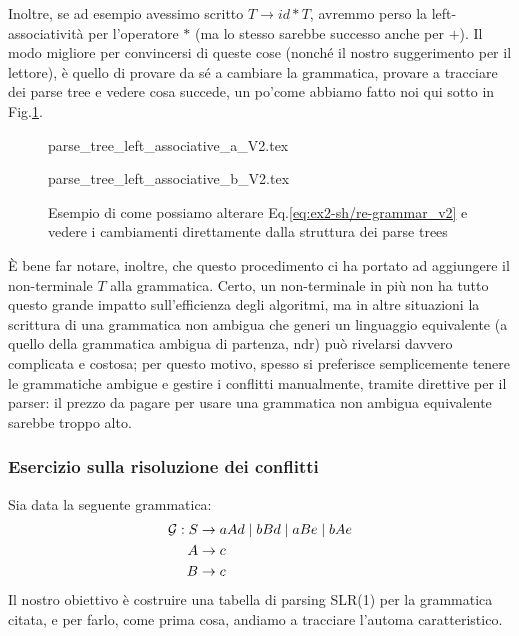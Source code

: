 \documentclass[class=book, crop=false, oneside, 12pt]{standalone}
\begin{document}
Inoltre, se ad esempio avessimo scritto \(T \to id * T\), avremmo perso la left-associatività per l'operatore \(\ast\) (ma lo stesso sarebbe successo anche per \(+\)). Il modo migliore per convincersi di queste cose (nonché il nostro suggerimento per il lettore), è quello di provare da sé a cambiare la grammatica, provare a tracciare dei parse tree e vedere cosa succede, un po'come abbiamo fatto noi qui sotto in Fig.\ref{fig:ex2-sh_re-altgrm-ptree}.
\begin{figure}[H]
    \begin{minipage}[b]{.4\textwidth}
        \centering
        {parse_tree_left_associative_a_V2.tex}
        \label{fig:ex2-sh_re-altgrm-ptree_1}
    \end{minipage}
    \hfill
    \begin{minipage}[b]{.4\textwidth}
        \centering
        {parse_tree_left_associative_b_V2.tex}
        \label{fig:ex2-sh_re-altgrm-ptree_2}
    \end{minipage}
    \caption{Esempio di come possiamo alterare Eq.\ref{eq:ex2-sh/re-grammar_v2} e vedere i cambiamenti direttamente dalla struttura dei parse trees}
    \label{fig:ex2-sh_re-altgrm-ptree}
\end{figure}

È bene far notare, inoltre, che questo procedimento ci ha portato ad aggiungere il non-terminale \(T\) alla grammatica. Certo, un non-terminale in più non ha tutto questo grande impatto sull'efficienza degli algoritmi, ma in altre situazioni la scrittura di una grammatica non ambigua che generi un linguaggio equivalente (a quello della grammatica ambigua di partenza, ndr) può rivelarsi davvero complicata e costosa; per questo motivo, spesso si preferisce semplicemente tenere le grammatiche ambigue e gestire i conflitti manualmente, tramite direttive per il parser: il prezzo da pagare per usare una grammatica non ambigua equivalente sarebbe troppo alto.

\subsubsection{Esercizio sulla risoluzione dei conflitti}
Sia data la seguente grammatica:
\begin{align}
    \label{eq:ex3-slr1-grammar}
    \mathcal{G}: S &\to aAd \mid bBd \mid aBe \mid bAe \\
    A &\to c \nonumber \\ \notag
    B &\to c \notag
\end{align}
Il nostro obiettivo è costruire una tabella di parsing SLR(1) per la grammatica citata, e per farlo, come prima cosa, andiamo a tracciare l'automa caratteristico.
\end{document}
